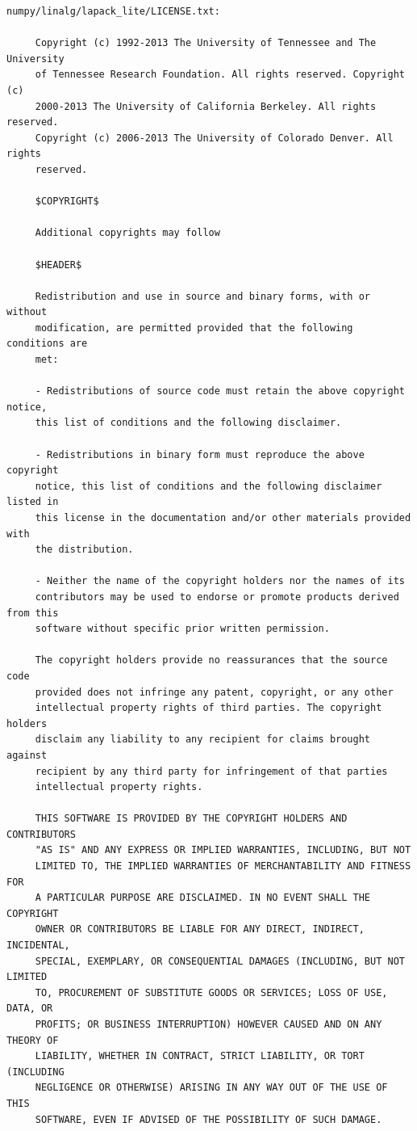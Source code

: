 \begin{lstlisting}[basicstyle=\ttfamily\footnotesize,breaklines=true]
     numpy/linalg/lapack_lite/LICENSE.txt:

     Copyright (c) 1992-2013 The University of Tennessee and The University
     of Tennessee Research Foundation. All rights reserved. Copyright (c)
     2000-2013 The University of California Berkeley. All rights reserved.
     Copyright (c) 2006-2013 The University of Colorado Denver. All rights
     reserved.

     $COPYRIGHT$

     Additional copyrights may follow

     $HEADER$

     Redistribution and use in source and binary forms, with or without
     modification, are permitted provided that the following conditions are
     met:

     - Redistributions of source code must retain the above copyright notice,
     this list of conditions and the following disclaimer.

     - Redistributions in binary form must reproduce the above copyright
     notice, this list of conditions and the following disclaimer listed in
     this license in the documentation and/or other materials provided with
     the distribution.

     - Neither the name of the copyright holders nor the names of its
     contributors may be used to endorse or promote products derived from this
     software without specific prior written permission.

     The copyright holders provide no reassurances that the source code
     provided does not infringe any patent, copyright, or any other
     intellectual property rights of third parties. The copyright holders
     disclaim any liability to any recipient for claims brought against
     recipient by any third party for infringement of that parties
     intellectual property rights.

     THIS SOFTWARE IS PROVIDED BY THE COPYRIGHT HOLDERS AND CONTRIBUTORS
     "AS IS" AND ANY EXPRESS OR IMPLIED WARRANTIES, INCLUDING, BUT NOT
     LIMITED TO, THE IMPLIED WARRANTIES OF MERCHANTABILITY AND FITNESS FOR
     A PARTICULAR PURPOSE ARE DISCLAIMED. IN NO EVENT SHALL THE COPYRIGHT
     OWNER OR CONTRIBUTORS BE LIABLE FOR ANY DIRECT, INDIRECT, INCIDENTAL,
     SPECIAL, EXEMPLARY, OR CONSEQUENTIAL DAMAGES (INCLUDING, BUT NOT LIMITED
     TO, PROCUREMENT OF SUBSTITUTE GOODS OR SERVICES; LOSS OF USE, DATA, OR
     PROFITS; OR BUSINESS INTERRUPTION) HOWEVER CAUSED AND ON ANY THEORY OF
     LIABILITY, WHETHER IN CONTRACT, STRICT LIABILITY, OR TORT (INCLUDING
     NEGLIGENCE OR OTHERWISE) ARISING IN ANY WAY OUT OF THE USE OF THIS
     SOFTWARE, EVEN IF ADVISED OF THE POSSIBILITY OF SUCH DAMAGE.





\end{lstlisting}
